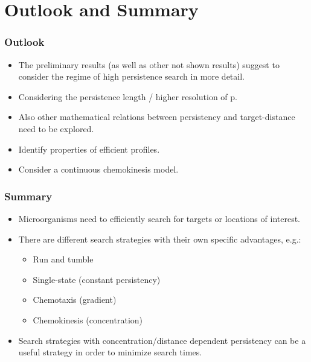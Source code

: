 \documentclass[11pt]{beamer}
\begin{document}
\section{Outlook and Summary}
\begin{frame}
 \frametitle{Outlook}
 
 \begin{itemize}
  \item The preliminary results (as well as other not shown results) suggest to consider the regime of high persistence search in more detail.
  \item Considering the persistence length / higher resolution of p.
  \item Also other mathematical relations between persistency and target-distance need to be explored.
  \item Identify properties of efficient profiles.
  \item Consider a continuous chemokinesis model.
 \end{itemize}

\end{frame}

\begin{frame}
 \frametitle{Summary}
 
 \begin{itemize}
  \item Microorganisms need to efficiently search for targets or locations of interest.
  \item There are different search strategies with their own specific advantages, e.g.:
  \begin{itemize}
   \item Run and tumble
   \item Single-state (constant persistency)
   \item Chemotaxis (gradient)
   \item Chemokinesis (concentration)
  \end{itemize}
  \item Search strategies with concentration/distance dependent persistency can be a useful strategy in order to minimize search times.
 \end{itemize}

\end{frame}
\end{document}
